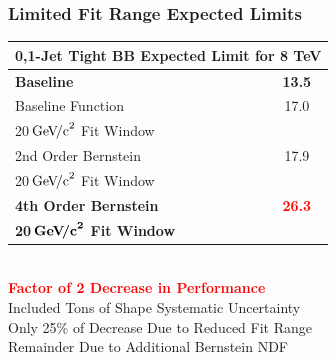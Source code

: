 \documentclass{beamer}
\newcommand{\GeVcc}{\ensuremath{\,\mathrm{Ge\kern -0.1em V\!/c}^2}}
\newcommand{\tredbf}[1]{\textcolor{red}{\bf #1}}
\begin{document}
\begin{frame}
\frametitle{Limited Fit Range Expected Limits}
\begin{center}
\begin{tabular}{|l|c|} \hline
\multicolumn{2}{|c|}{ \bf 0,1-Jet Tight BB Expected Limit for 8 TeV} \\ \hline
\bf Baseline          &      \bf 13.5   \\ \hline
Baseline Function         & 17.0        \\
20\GeVcc{} Fit Window       &         \\ \hline
2nd Order Bernstein         & 17.9        \\
20\GeVcc{} Fit Window       &         \\ \hline
\bf 4th Order Bernstein         & \tredbf{26.3}        \\
\bf 20$\bm{\GeVcc{}}$ Fit Window       &         \\ \hline
\end{tabular}
\\ \vspace{1em}
\Large \tredbf{
Factor of 2 Decrease in Performance
}
\\
Included Tons of Shape Systematic Uncertainty
\\
Only 25\% of Decrease Due to Reduced Fit Range
\\
Remainder Due to Additional Bernstein NDF
\end{center}
\end{frame}
\end{document}
